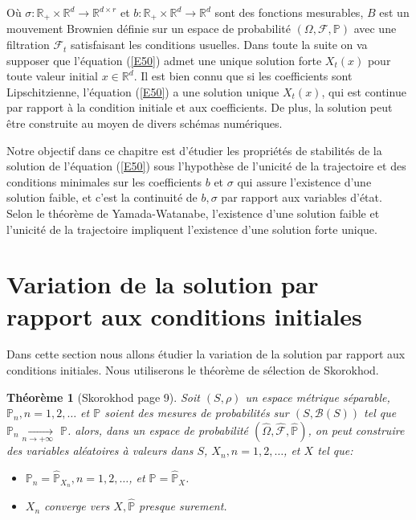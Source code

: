 \documentclass[A4paper,12pt]{report}
\newtheorem{theorem}{Th\'eor\`eme}[chapter]
\newcommand{\R}{{\mathbb{R}}}
\newcommand{\pr}{{\mathbb{P}}}
\begin{document}
Où $\sigma: \R_{+} \times \R^d \longrightarrow \R^{d\times r}$ et $b: \R_{+} \times \R^d \longrightarrow \R^d$ sont des fonctions mesurables, $B$ est un mouvement Brownien définie sur un espace  de probabilité $(\Omega, \mathcal{F}, \pr)$ avec une filtration $\mathcal{F}_{t}$ satisfaisant les conditions usuelles. Dans toute la suite on va supposer que l'équation (\ref{E50}) admet une unique solution forte $X_{t}(x)$ pour toute valeur initial  $x \in \R^d$. Il est bien connu que si les coefficients sont Lipschitzienne, l'équation (\ref{E50}) a une solution unique $X_{t}(x)$, qui est continue par rapport à la condition initiale et aux coefficients. De plus, la solution peut être construite au moyen de divers schémas numériques.

Notre objectif dans ce chapitre est d'étudier les propriétés de stabilités de la solution de l'équation (\ref{E50}) sous l'hypothèse de l'unicité de la trajectoire et des conditions minimales sur les coefficients $b$ et $\sigma$ qui   assure l'existence d'une solution faible, et c'est la continuité de $b, \sigma$ par rapport aux variables d'état. Selon le théorème de Yamada-Watanabe, l'existence d'une solution faible et l'unicité de la trajectoire impliquent l'existence d'une solution forte unique.
\section{Variation de la solution par rapport aux conditions initiales}
Dans cette section nous allons étudier la variation de la solution par rapport aux conditions initiales. Nous utiliserons le théorème de sélection de Skorokhod.
\begin{theorem}[Skorokhod \cite{Ikeda}  page 9] 
Soit $(S, \rho)$ un espace métrique séparable, $\pr_{n}, n=1,2, \ldots$ et $\pr$ soient des mesures de probabilités sur $(S, \mathcal{B}(S))$ tel que $\pr_{n} \underset{n \rightarrow+\infty}{\longrightarrow}$ $\pr$. alors, dans un espace de probabilité $(\widehat{\Omega}, \widehat{\mathcal{F}}, \widehat{\pr})$, on peut construire des variables aléatoires à valeurs dans $S$, $X_{n}, n=1,2, \ldots$, et $X$ tel que:
\begin{itemize}
\item[i)] $\pr_{n}=\widehat{\pr}_{X_{n}}, n=1,2, \ldots$, et $\pr =\widehat{\pr}_{X}$.

\item[ii)] $X_{n}$ converge vers $X, \widehat{\pr}$ presque surement.

\end{itemize}
\end{theorem} 
\end{document}
